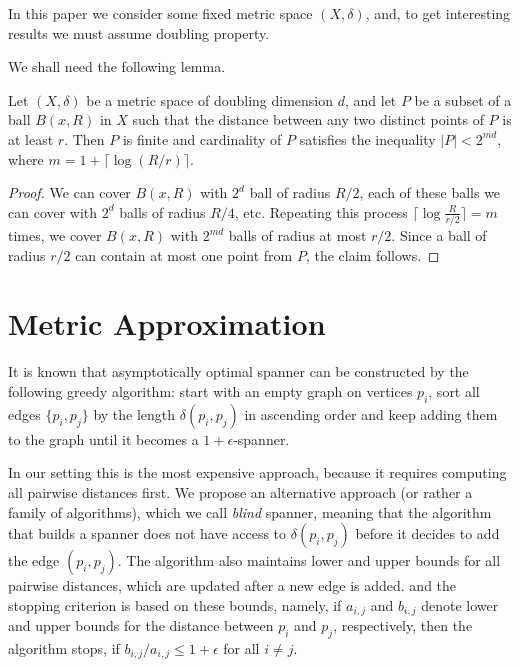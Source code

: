 \documentclass[a4paper,USenglish]{socg-lipics-v2018}
\newcommand{\eps}{\epsilon}
\newcommand{\dist}{\delta}
\begin{document}
In this paper we consider some fixed metric space $(X, \dist)$, and, to get interesting
results we must assume doubling property.

We shall need the following lemma.

\begin{lemma}
\label{lem:packing_lemma_dd}
Let $(X,\dist)$ be a metric space of doubling dimension $d$, and let $P$ be a subset of a ball $B(x,R)$ in $X$ such that the distance between any two distinct points of $P$ is at least $r$.
Then $P$ is finite and cardinality of $P$ satisfies the inequality $|P| < 2^{md}$, where $m = 1 + \lceil \log (R/r) \rceil $. 
\end{lemma}

\begin{proof}
We can cover $B(x,R)$ with $2^d$ ball of radius $R/2$, each of these balls we can cover with $2^d$
balls of radius $R/4$, etc. Repeating this process $\lceil \log \frac{R}{r/2} \rceil = m $ times, 
we cover
$B(x, R)$ with $2^{md}$ balls of radius at most $r/2$. Since a ball of radius $r/2$ can contain at most one point from $P$, the claim follows.
\end{proof}


\section{Metric Approximation}

It is known that asymptotically optimal spanner can be constructed by the following greedy algorithm: 
start with an empty graph on vertices $p_i$,
sort all edges $\{p_i, p_j\}$ by the length $\dist(p_i, p_j)$ in ascending order and keep adding them to the graph
until it becomes a $1+\eps$-spanner. 


 In our setting this is the most expensive approach, because it requires
 computing all pairwise distances first. We propose an alternative approach (or rather a family of algorithms), which we call
 \textit{blind} spanner, meaning that the algorithm that builds a spanner does not have access to $\dist(p_i, p_j)$
 before it decides to add the edge $(p_i, p_j)$.
 The algorithm also maintains lower and upper bounds
 for all pairwise distances, which are updated after a new edge is added. and the stopping criterion
 is based on these bounds, namely, if $a_{i, j}$ and $b_{i,j}$ denote lower and upper bounds
 for the distance between $p_i$ and $p_j$, respectively, then the algorithm stops, if $b_{i,j} / a_{i, j} \leq 1 + \eps$
 for all $i \neq j$.
\end{document}
